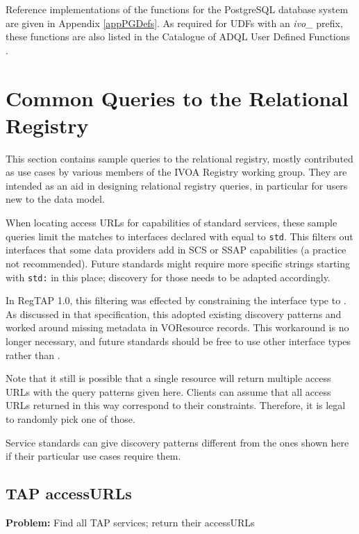 \documentclass[11pt,a4paper]{ivoa}
\begin{document}
Reference implementations of the functions for the PostgreSQL
database system are given in Appendix \ref{appPGDefs}.  As required for
UDFs with an \emph{ivo\_} prefix, these functions are also listed in the
Catalogue of ADQL User Defined Functions \citep{2023ivoa.spec.1117C}.



\section{Common Queries to the Relational Registry}

\label{sample_queries}

This section contains sample queries to the relational registry,
mostly contributed as use cases by various members of the IVOA Registry
working group.  They are intended as an aid in designing relational
registry queries, in particular for users new to the data model.

When locating access URLs for capabilities of standard services, these
sample queries limit the matches to interfaces declared with
 equal to \verb|std|.
This filters out  interfaces that some data providers
add in SCS or SSAP capabilities (a practice not recommended).
Future standards might require more specific strings starting with
\verb|std:| in this place; discovery for those needs to be adapted
accordingly.

In RegTAP 1.0, this filtering was effected by constraining the interface
type to .  As discussed in that specification, this adopted
existing discovery patterns and worked around missing metadata in
VOResource records.   This workaround is no
longer necessary, and future standards should be free to use other
interface types rather than .

Note that it still is possible that a single resource will return
multiple access URLs with the query patterns given here.  Clients can
assume that all access URLs returned in this way correspond to their
constraints.  Therefore, it is legal to randomly pick one of those.

Service standards can give discovery patterns different from the ones
shown here if their particular use cases require them.

\subsection{TAP accessURLs}
\textbf{Problem:} Find all TAP services; return their accessURLs
\end{document}
